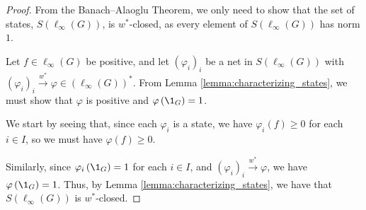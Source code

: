 \begin{proof}
  From the Banach--Alaoglu Theorem, we only need to show that the set of states, $S\left(\ell_{\infty}\left(G\right)\right)$, is $w^{\ast}$-closed, as every element of $S\left(\ell_{\infty}\left(G\right)\right)$ has norm $1$.\newline

  Let $f\in \ell_{\infty}\left(G\right)$ be positive, and let $\left(\varphi_{i}\right)_i$ be a net in $S\left(\ell_{\infty}\left(G\right)\right)$ with $\left(\varphi_{i}\right)_i\xrightarrow{w^{\ast}} \varphi\in \left(\ell_{\infty}\left(G\right)\right)^{\ast}$. From Lemma \ref{lemma:characterizing_states}, we must show that $\varphi$ is positive and $\varphi\left(\1_{G}\right) = 1$.\newline

  We start by seeing that, since each $\varphi_i$ is a state, we have $\varphi_{i}\left(f\right) \geq 0$ for each $i\in I$, so we must have $\varphi\left(f\right) \geq 0$.\newline

  Similarly, since $\varphi_{i}\left(\1_{G}\right) = 1$ for each $i\in I$, and $\left(\varphi_i\right)_i \xrightarrow{w^{\ast}} \varphi$, we have $\varphi\left(\1_{G}\right) = 1$. Thus, by Lemma \ref{lemma:characterizing_states}, we have that $S\left(\ell_{\infty}\left(G\right)\right)$ is $w^{\ast}$-closed.
\end{proof}

